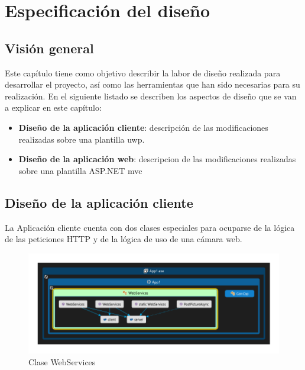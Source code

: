\chapter{Especificación del diseño}\label{chap:design}

\section{Visión general}

Este capítulo tiene como objetivo describir la labor de diseño realizada para desarrollar el proyecto, así como las herramientas que han sido necesarias para su realización. En el siguiente listado se describen los aspectos de diseño que se van a explicar en este capítulo:

\begin{itemize}
	\item \textbf{Diseño de la aplicación cliente}: descripción de las modificaciones realizadas sobre una plantilla \acrshort{uwp}.
	\item \textbf{Diseño de la aplicación web}: descripcion de las modificaciones realizadas sobre una plantilla ASP.NET \acrshort{mvc}

\end{itemize}

\section{Diseño de la aplicación cliente}

La Aplicación cliente cuenta con dos clases especiales para ocuparse de la lógica de las peticiones HTTP y de la lógica de uso de una cámara web.

\begin{figure}[!htbp]
	\centering
	\includegraphics[angle=90, scale=1.0]{fig/WebServices}
	\caption{Clase WebServices}
\end{figure}

\FloatBarrier

